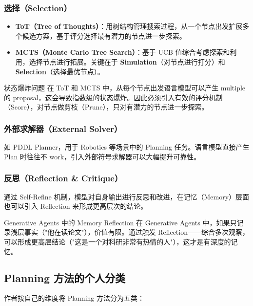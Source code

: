 \subsubsection{选择（Selection）}

\begin{itemize}
    \item \textbf{ToT（Tree of Thoughts）}：用树结构管理搜索过程，从一个节点出发扩展多个候选方案，基于评分选择最有潜力的节点进一步探索。
    \item \textbf{MCTS（Monte Carlo Tree Search）}：基于 UCB 值综合考虑探索和利用，选择节点进行拓展。关键在于 \textbf{Simulation}（对节点进行打分）和 \textbf{Selection}（选择最优节点）。
\end{itemize}

\begin{warningbox}{状态爆炸问题}
在 ToT 和 MCTS 中，从每个节点出发语言模型可以产生 multiple 的 proposal，这会导致指数级的状态爆炸。因此必须引入有效的评分机制（Score），对节点做剪枝（Prune），只对有潜力的节点进一步探索。
\end{warningbox}

\subsubsection{外部求解器（External Solver）}

如 PDDL Planner，用于 Robotics 等场景中的 Planning 任务。语言模型直接产生 Plan 时往往不 work，引入外部符号求解器可以大幅提升可靠性。

\subsubsection{反思（Reflection \& Critique）}

通过 Self-Refine 机制，模型对自身输出进行反思和改进，在记忆（Memory）层面也可以引入 Reflection 来形成更高层次的结论。

\begin{knowledgebox}{Generative Agents 中的 Memory Reflection}
在 Generative Agents 中，如果只记录浅层事实（"他在读论文"），价值有限。通过触发 Reflection——综合多次观察，可以形成更高层结论（"这是一个对科研非常有热情的人"），这才是有深度的记忆。
\end{knowledgebox}

\subsection{Planning 方法的个人分类}

作者按自己的维度将 Planning 方法分为五类：

